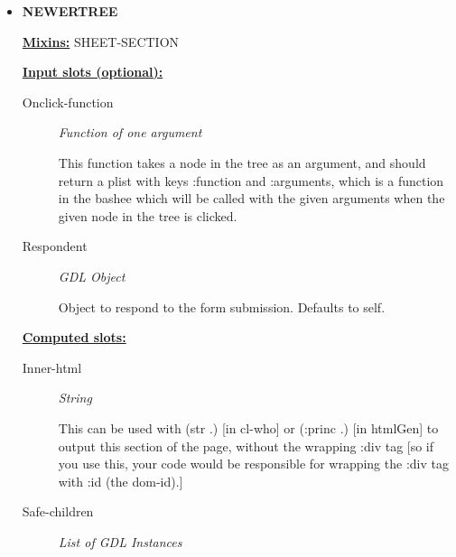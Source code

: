\documentclass [11pt]{book}
\begin{document}
\begin{itemize}

\item {}
\textbf{NEWERTREE}


\textbf{
\underline{Mixins:}} SHEET-SECTION





\begin{description}

\end{description}








\textbf{
\underline{Input slots (optional):}}

\begin{description}

\item [Onclick-function]
\emph{Function of one argument}

 This function takes a node in the tree as an argument, and should return
a plist with keys :function and :arguments, which is a function in the bashee which will be called
with the given arguments when the given node in the tree is clicked.




\item [Respondent]
\emph{GDL Object}

 Object to respond to the form submission. Defaults to self.




\end{description}






\textbf{
\underline{Computed slots:}}

\begin{description}

\item [Inner-html]
\emph{String}

 This can be used with (str .) [in cl-who] or (:princ .) [in htmlGen]
to output this section of the page, without the wrapping :div tag [so if you use this,
your code would be responsible for wrapping the :div tag with :id (the dom-id).]




\item [Safe-children]
\emph{List of GDL Instances}


\end{description}
\end{itemize}
\end{document}
